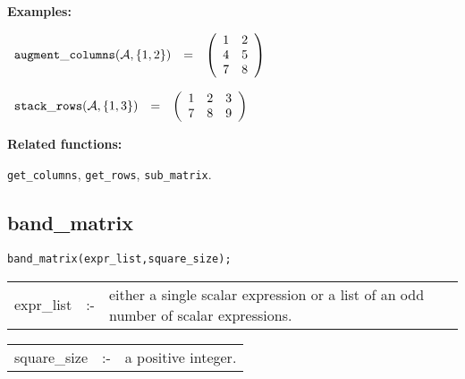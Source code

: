 {\bf Examples:}

\begin{flushleft}
\hspace*{0.1in}
\begin{math}
\begin{array}{ccc}
{\tt augment\_columns}({\cal A},\{1,2\}) & = &
\left( \begin{array}{cc} 1 & 2 \\ 4 & 5 \\ 7 & 8
\end{array} \right)
\end{array}
\end{math}
\end{flushleft}

\vspace*{0.1in}

\begin{flushleft}
\hspace*{0.1in}
\begin{math}
\begin{array}{ccc}
{\tt stack\_rows}({\cal A},\{1,3\}) & = &
\left( \begin{array}{ccc} 1 & 2 & 3 \\ 7 & 8 & 9
\end{array} \right)
\end{array}
\end{math}
\end{flushleft}

{\bf Related functions:}

\hspace*{0.175in} {\tt get\_columns}, {\tt get\_rows},
{\tt sub\_matrix}.


\subsection{band\_matrix}


\hspace*{0.175in} {\tt band\_matrix(expr\_list,square\_size);}

\hspace*{0.1in}
\begin{tabular}{l l l}
expr\_list  \hspace*{0.088in} &:-& \parbox[t]{.72\linewidth}
{either a single scalar expression or a list of an odd number of scalar
expressions.}
\end{tabular}

\vspace*{0.04in}
\hspace*{0.1in}
\begin{tabular}{l l l}
square\_size &:-& a positive integer.
\end{tabular}


